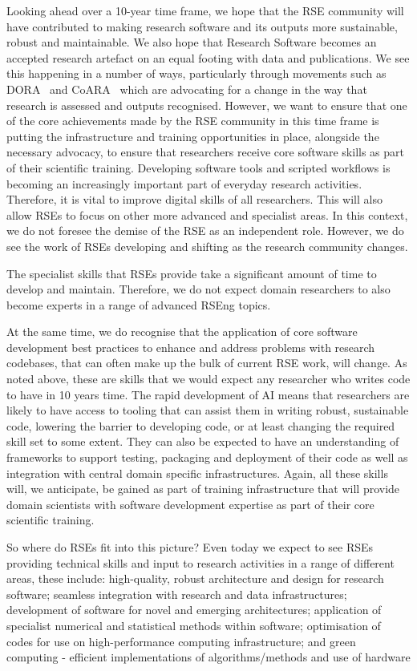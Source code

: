 \documentclass{eceasst}
\begin{document}
Looking ahead over a 10-year time frame, we hope that the RSE community will have
contributed to making research software and its outputs
more sustainable, robust and maintainable.
We also hope that Research Software becomes an accepted research artefact on an equal footing with data and publications.
We see this happening in a number of ways,
particularly through movements such as DORA~\cite{DORA} and CoARA~\cite{COARA} which are advocating for a change in the way that research is assessed and outputs recognised.
However, we want to ensure that one of the core achievements made by the RSE community in this time
frame is putting the infrastructure and training opportunities in place, alongside the necessary
advocacy, to ensure that researchers receive core software skills as part of their scientific training.
Developing software tools and scripted workflows is becoming an increasingly important part of everyday
research activities.
Therefore, it is vital to improve digital skills of all researchers.
This will also allow RSEs to focus on other more advanced and specialist
areas. In this context, we do not foresee the demise of the RSE as an independent role. However, we
do see the work of RSEs developing and shifting as the research community changes.

The specialist skills that RSEs provide take a significant amount of time to develop and maintain.
Therefore, we do not expect domain researchers to also become experts in a range of
advanced RSEng topics. 

At the same time, we do recognise that the application of core software development best practices
to enhance and address problems with research codebases, that can often make up the bulk of
current RSE work, will change. As noted above, these are skills that we
would expect any researcher who writes code to have in 10 years time. 
The rapid development of AI means that researchers are likely to have access to tooling that can assist
them in writing robust, sustainable code, lowering the barrier to developing code, or at least changing the
required skill set to some extent.
They can also be expected to have an understanding of frameworks to support testing, packaging and
deployment of their code as well as integration with central domain specific infrastructures.
Again, all these skills will, we anticipate, be gained as part of training infrastructure that will
provide domain scientists with software development expertise as part of their core scientific training.

So where do RSEs fit into this picture? Even today we expect to see RSEs providing technical skills and input
to research activities in a range of different areas, these include:
high-quality, robust architecture and design for research software;
seamless integration with research and data infrastructures;
development of software for novel and emerging architectures;
application of specialist numerical and statistical methods within software;
optimisation of codes for use on high-performance computing infrastructure;
and green computing - efficient implementations of algorithms/methods and use of hardware
\end{document}
